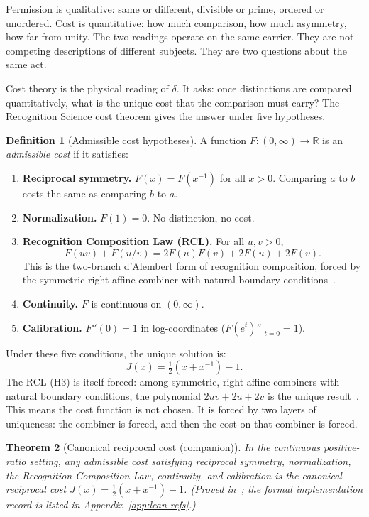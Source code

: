 \documentclass[11pt,a4paper]{article}
\newtheorem{theorem}{Theorem}[section]
\theoremstyle{definition}
\newtheorem{definition}[theorem]{Definition}
\theoremstyle{remark}
\begin{document}
Permission is qualitative: same or different, divisible or prime, ordered or
unordered. Cost is quantitative: how much comparison, how much asymmetry, how
far from unity. The two readings operate on the same carrier. They are not
competing descriptions of different subjects. They are two questions about the
same act.

Cost theory is the physical reading of $\delta$. It asks: once distinctions
are compared quantitatively, what is the unique cost that the comparison must
carry? The Recognition Science cost theorem gives the answer under five
hypotheses.

\begin{definition}[Admissible cost hypotheses]\label{def:costhyp}
A function $F : (0,\infty) \to \mathbb{R}$ is an \emph{admissible cost} if
it satisfies:
\begin{enumerate}[leftmargin=2.5em, label=\textup{(H\arabic*)}]
  \item \textbf{Reciprocal symmetry.} $F(x) = F(x^{-1})$ for all $x > 0$.
    Comparing $a$ to $b$ costs the same as comparing $b$ to $a$.
  \item \textbf{Normalization.} $F(1) = 0$. No distinction, no cost.
  \item \textbf{Recognition Composition Law (RCL).} For all $u, v > 0$,
    \[
      F(uv) + F(u/v)
      = 2F(u)F(v) + 2F(u) + 2F(v).
    \]
    This is the two-branch d'Alembert form of recognition composition, forced
    by the symmetric right-affine combiner with natural boundary
    conditions~\cite{Washburn2026LogicFE}.
  \item \textbf{Continuity.} $F$ is continuous on $(0,\infty)$.
  \item \textbf{Calibration.} $F''(0) = 1$ in log-coordinates
    ($F(e^t)''|_{t=0} = 1$).
\end{enumerate}
\end{definition}

Under these five conditions, the unique solution is:
\begin{equation}\label{eq:jcost}
  J(x) = \tfrac{1}{2}(x + x^{-1}) - 1.
\end{equation}
The RCL (H3) is itself forced: among symmetric, right-affine combiners with
natural boundary conditions, the polynomial $2uv + 2u + 2v$ is the unique
result~\cite{Washburn2026LogicFE}. This means the cost function is not chosen.
It is forced by two layers of uniqueness: the combiner is forced, and then the
cost on that combiner is forced.

\begin{theorem}[Canonical reciprocal cost (companion)]\label{thm:jcost}
In the continuous positive-ratio setting, any admissible cost satisfying
reciprocal symmetry, normalization, the Recognition Composition Law,
continuity, and calibration is the canonical reciprocal cost
$J(x)=\tfrac{1}{2}(x+x^{-1})-1$.
\textup{(Proved in~\cite{Washburn2026LogicFE,WashburnZlatanovic2026};
the formal implementation record is listed in Appendix~\ref{app:lean-refs}.)}
\end{theorem}
\end{document}
